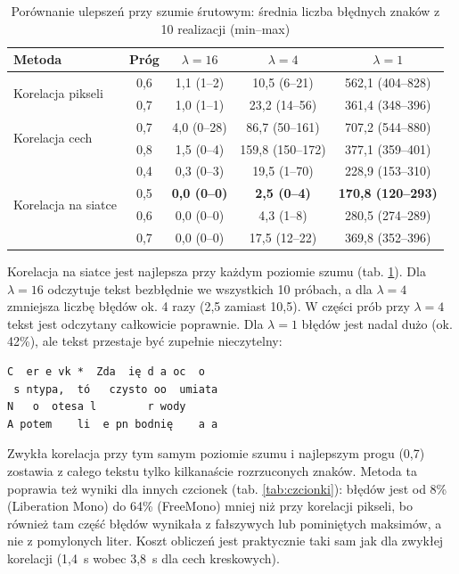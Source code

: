 \documentclass[12pt]{article}
\begin{document}
\begin{table}[H]
    \centering
    \begin{tabular}{|l|c|c|c|c|}
        \hline
        \textbf{Metoda} & \textbf{Próg} & \textbf{$\lambda = 16$} & \textbf{$\lambda = 4$} & \textbf{$\lambda = 1$} \\
        \hline
        \multirow{2}{*}{Korelacja pikseli}
            & 0,6 & 1,1 (1--2) & 10,5 (6--21) & 562,1 (404--828) \\
            & 0,7 & 1,0 (1--1) & 23,2 (14--56) & 361,4 (348--396) \\
        \hline
        \multirow{2}{*}{Korelacja cech}
            & 0,7 & 4,0 (0--28) & 86,7 (50--161) & 707,2 (544--880) \\
            & 0,8 & 1,5 (0--4) & 159,8 (150--172) & 377,1 (359--401) \\
        \hline
        \multirow{4}{*}{Korelacja na siatce}
            & 0,4 & 0,3 (0--3) & 19,5 (1--70) & 228,9 (153--310) \\
            & 0,5 & \textbf{0,0 (0--0)} & \textbf{2,5 (0--4)} & \textbf{170,8 (120--293)} \\
            & 0,6 & 0,0 (0--0) & 4,3 (1--8) & 280,5 (274--289) \\
            & 0,7 & 0,0 (0--0) & 17,5 (12--22) & 369,8 (352--396) \\
        \hline
    \end{tabular}
    \caption{Porównanie ulepszeń przy szumie śrutowym: średnia liczba błędnych znaków z 10 realizacji (min--max)}
    \label{tab:szum_lepsze}
\end{table}

Korelacja na siatce jest najlepsza przy każdym poziomie szumu (tab. \ref{tab:szum_lepsze}). Dla $\lambda=16$ odczytuje tekst bezbłędnie we wszystkich 10 próbach, a dla $\lambda=4$ zmniejsza liczbę błędów ok. 4 razy (2,5 zamiast 10,5). W części prób przy $\lambda=4$ tekst jest odczytany całkowicie poprawnie. Dla $\lambda=1$ błędów jest nadal dużo (ok. 42\%), ale tekst przestaje być zupełnie nieczytelny:
\begin{verbatim}
C  er e vk *  Zda  ię d a oc  o
 s ntypa,  tó   czysto oo  umiata
N   o  otesa l        r wody
A potem    li  e pn bodnię    a a
\end{verbatim}
Zwykła korelacja przy tym samym poziomie szumu i najlepszym progu (0,7) zostawia z całego tekstu tylko kilkanaście rozrzuconych znaków. Metoda ta poprawia też wyniki dla innych czcionek (tab. \ref{tab:czcionki}): błędów jest od 8\% (Liberation Mono) do 64\% (FreeMono) mniej niż przy korelacji pikseli, bo również tam część błędów wynikała z fałszywych lub pominiętych maksimów, a nie z pomylonych liter. Koszt obliczeń jest praktycznie taki sam jak dla zwykłej korelacji (1,4~s wobec 3,8~s dla cech kreskowych).
\end{document}
